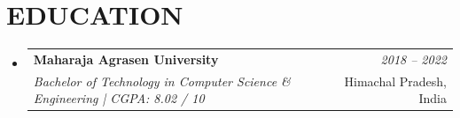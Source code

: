 \documentclass[a4paper,11pt]{article}
\makeatletter
\newcommand{\resumeSubheading}[4]{
  \vspace{0.5mm}\item
  \begin{tabular*}{0.98\textwidth}[t]{l@{\extracolsep{\fill}}r}
      \textbf{#1} & \textit{\footnotesize #4} \\
      \textit{\footnotesize #3} &  \footnotesize #2 \\
  \end{tabular*}
  \vspace{-2.4mm}
}
\newcommand{\resumeSubHeadingListStart}{\begin{itemize}[leftmargin=*,labelsep=1mm]}
\newcommand{\resumeSubHeadingListEnd}{\end{itemize}\vspace{1mm}}
\makeatother
\begin{document}
\section{\textbf{EDUCATION}}
\vspace{-0.4mm}
\resumeSubHeadingListStart
\resumeSubheading
{Maharaja Agrasen University}{Himachal Pradesh, India}
{Bachelor of Technology in Computer Science \& Engineering | CGPA: 8.02 / 10}{2018 -- 2022}
\resumeSubHeadingListEnd
\vspace{-6mm}

\end{document}
